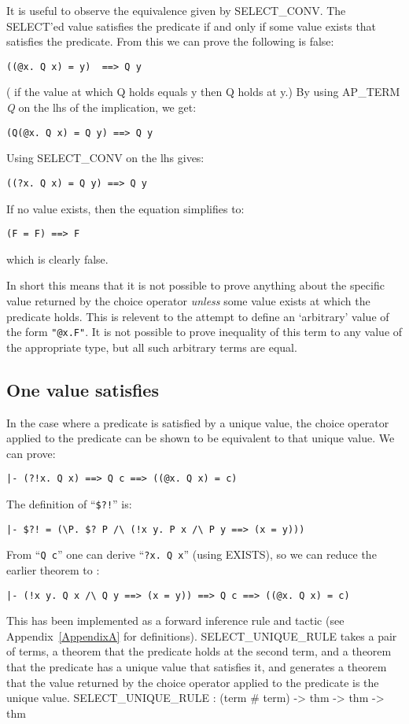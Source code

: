It is useful to observe the equivalence given by SELECT\_CONV.  The
SELECT'ed value satisfies the predicate if and only if some value
exists that satisfies the predicate.  From this we can prove the
following is false:
\begin{center}
\verb+((@x. Q x) = y)  ==> Q y+
\end{center}
(\ie{} if the value at which Q holds equals y then Q holds at y.)
By using AP\_TERM {\it Q\/} on the lhs of the implication, we get:
\begin{center}
\verb+(Q(@x. Q x) = Q y) ==> Q y+
\end{center}
Using SELECT\_CONV on the lhs gives:
\begin{center}
\verb+((?x. Q x) = Q y) ==> Q y+
\end{center}
If no value exists, then the equation simplifies to:
\begin{center}
\verb+(F = F) ==> F+
\end{center}
which is clearly false.  

In short this means that it is not possible to prove
anything about the specific value returned by the choice operator
{\it unless\/} some value exists at which the predicate holds.  This 
is relevent to the attempt to define an `arbitrary' value of the
form \verb+"@x.F"+. 
It is not possible to prove inequality of this term to any value of
the appropriate type, but all such arbitrary terms are equal.

\subsection{One value satisfies}\label{sec:one}

In the case where a predicate is satisfied by a unique value, the
choice operator applied to the predicate can be shown to be equivalent
to that unique value.  We can prove:
\begin{center}
\verb+|- (?!x. Q x) ==> Q c ==> ((@x. Q x) = c)+
\end{center}
The definition of ``\verb+$?!+'' is:
\begin{center}
\verb+|- $?! = (\P. $? P /\ (!x y. P x /\ P y ==> (x = y)))+
\end{center}
From ``\verb+Q c+'' one can derive ``\verb+?x. Q x+'' (using EXISTS),
so we can reduce the earlier theorem to :
\begin{center}
\verb+|- (!x y. Q x /\ Q y ==> (x = y)) ==> Q c ==> ((@x. Q x) = c)+
\end{center}
This has been implemented as a forward inference rule and tactic
(see Appendix~\ref{AppendixA} for definitions).  SELECT\_UNIQUE\_RULE
takes a pair of terms, a theorem that the predicate holds at the
second term, and a theorem that the predicate has a unique value that
satisfies it, and generates a theorem that the value returned by the
choice operator applied to the predicate is the unique value.  
\begintt
    SELECT_UNIQUE_RULE : (term # term) -> thm -> thm -> thm

